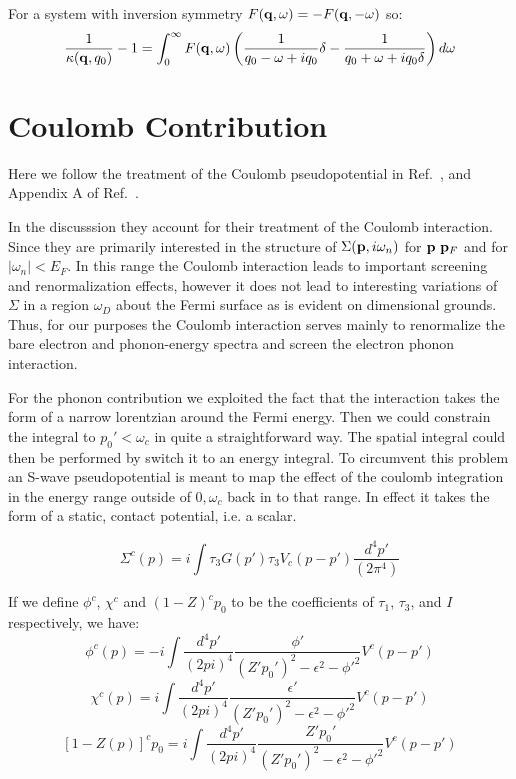 \documentclass{article}
\def\q{{\bf q}}
\def\p{{\bf p}}
\begin{document}
For a system with inversion symmetry $F(\q,\omega) = -F(\q, -\omega)$ so:
%
\begin{equation}
\frac{1}{\kappa(\q,q_{0})}-1=\int_{0}^{\infty}F(\q,\omega)\left(\frac{1}{q_{0}-\omega+iq_{0}}\delta-\frac{1}{q_{0}+\omega+iq_{0}\delta}\right) d\omega
\end{equation}
%


\section{Coulomb Contribution}
Here we follow the treatment of the Coulomb pseudopotential in
Ref.~\cite{schrieffertext}, and Appendix A of Ref.~\cite{scalpino66}.

In the discusssion  they account for their treatment
of the Coulomb interaction. Since they are primarily interested
in the structure of $\Sigma(\p,i\omega_{n})$ for $\p~\p_{F}$ 
and for $|\omega_{n}|<E_{F}$. In this range the Coulomb
interaction leads to important screening and renormalization
effects, however it does not lead to interesting
variations of $\Sigma$ in a region $\omega_{D}$ about the Fermi
surface as is evident on dimensional grounds.
Thus, for our purposes the Coulomb interaction serves
mainly to renormalize the bare electron and phonon-energy
spectra and screen the electron phonon interaction.

For the phonon contribution we exploited the fact that the interaction takes the 
form of a narrow lorentzian around the Fermi energy. Then we could constrain the 
integral to $p_0'<\omega_{c}$ in quite a straightforward way. The spatial integral 
could then be performed by switch it to an energy integral. To circumvent this
problem an S-wave pseudopotential is meant to map the effect of the coulomb integration
in the energy range outside of $0,\omega_{c}$ back in to that range. In effect it takes
the form of a static, contact potential, i.e. a scalar. 

\begin{equation}
\Sigma^{c}(p) = i\int\tau_{3}G (p')\tau_{3}V_{c}(p-p') \frac{d^{4}p'}{(2\pi^{4})}
\end{equation}

If we define $\phi^{c}$, $\chi^{c}$ and $(1-Z)^{c}p_{0}$ to be the coefficients
of $\tau_{1}$, $\tau_{3}$, and $I$ respectively, we have:
%
\begin{equation}
\label{eq:phi}
\phi^{c}(p) = -i \int \frac{d^{4}p'}{(2pi)^{4}} \frac{\phi'}{(Z'p_{0}')^{2} -\epsilon^{2} - \phi'^{2}} V^{c}(p-p')
\end{equation}
%
\begin{equation}
\label{eq:chi}
\chi^{c}(p) = i \int \frac{d^{4}p'}{(2pi)^{4}} \frac{\epsilon'}{(Z'p_{0}')^{2} -\epsilon^{2} - \phi'^{2}} V^{c}(p-p')
\end{equation}
%
\begin{equation}
\label{eq:Z}
\left[1 - Z(p)\right]^{c}p_{0} = i \int \frac{d^{4}p'}{(2pi)^{4}} \frac{Z'p_{0}'}{(Z'p_{0}')^{2} -\epsilon^{2} - \phi'^{2}} V^{c}(p-p')
\end{equation}
\end{document}
